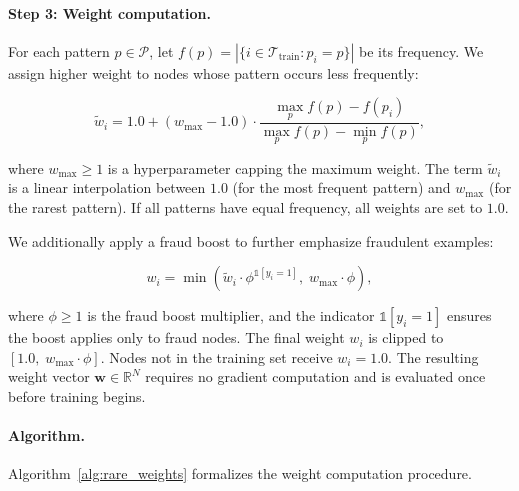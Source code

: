 \paragraph{Step 3: Weight computation.}
For each pattern $p \in \mathcal{P}$, let $f(p) = |\{i \in \mathcal{T}_{\text{train}} : p_i = p\}|$ be its frequency. We assign higher weight to nodes whose pattern occurs less frequently:

\begin{equation}
\tilde{w}_i = 1.0 + (w_{\text{max}} - 1.0) \cdot \frac{\max_{p} f(p) - f(p_i)}{\max_{p} f(p) - \min_{p} f(p)},
\label{eq:weight_norm}
\end{equation}

where $w_{\text{max}} \geq 1$ is a hyperparameter capping the maximum weight. The term $\tilde{w}_i$ is a linear interpolation between $1.0$ (for the most frequent pattern) and $w_{\text{max}}$ (for the rarest pattern). If all patterns have equal frequency, all weights are set to $1.0$.

We additionally apply a fraud boost to further emphasize fraudulent examples:

\begin{equation}
w_i = \min\left(\tilde{w}_i \cdot \phi^{\mathbb{1}[y_i = 1]}, \; w_{\text{max}} \cdot \phi\right),
\label{eq:fraud_boost}
\end{equation}

where $\phi \geq 1$ is the fraud boost multiplier, and the indicator $\mathbb{1}[y_i = 1]$ ensures the boost applies only to fraud nodes. The final weight $w_i$ is clipped to $[1.0, \; w_{\text{max}} \cdot \phi]$. Nodes not in the training set receive $w_i = 1.0$. The resulting weight vector $\mathbf{w} \in \mathbb{R}^N$ requires no gradient computation and is evaluated once before training begins.

\paragraph{Algorithm.}
Algorithm~\ref{alg:rare_weights} formalizes the weight computation procedure.

